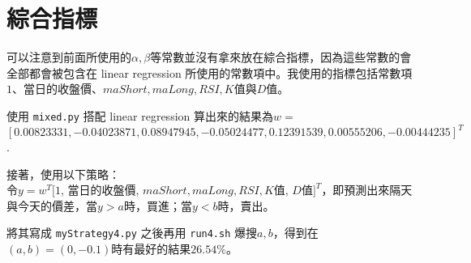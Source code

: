 \section{綜合指標}

可以注意到前面所使用的$\alpha, \beta$等常數並沒有拿來放在綜合指標，因為這些常數的會全部都會被包含在 linear regression 所使用的常數項中。我使用的指標包括常數項$1$、當日的收盤價、$maShort, maLong, RSI, K$值與$D$值。

使用 \texttt{mixed.py} 搭配 linear regression 算出來的結果為$w=$\\
$[0.00823331, -0.04023871, 0.08947945, -0.05024477, 0.12391539, 0.00555206, -0.00444235]^T$.

接著，使用以下策略：\\
令$y=w^T[1$, 當日的收盤價, $maShort, maLong, RSI, K$值, $D$值$]^T$，即預測出來隔天與今天的價差，當$y>a$時，買進；當$y<b$時，賣出。

將其寫成 \texttt{myStrategy4.py} 之後再用 \texttt{run4.sh} 爆搜$a, b$，得到在$(a, b)=(0, -0.1)$時有最好的結果$26.54\%$。
